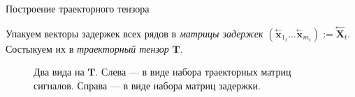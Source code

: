 \documentclass[10pt]{beamer}
\newcommand{\delayV}[1]{\overset{\leftarrow}{\textbf{x}}_{#1}}
\newcommand{\delayM}[1]{\overset{\leftarrow}{\mathbf{X}}_{#1}}
\theoremstyle{definition}
\begin{document}
	\begin{frame}{Построение траекторного тензора}
		
		Упакуем векторы задержек всех рядов в \emph{матрицы задержек} $ ( \delayV{1_t} \ldots \delayV{m_t} ) := \delayM{t} $. Состыкуем их в \emph{траекторный тензор} $ \textbf{T} $.
		
		\begin{figure}[h]
			\centering
			
			\caption{Два вида на $ \textbf{T} $. Слева --- в виде набора траекторных матриц сигналов. Справа --- в виде набора матриц задержки.}\label{pic:traj_tensor}
		\end{figure}
		
	\end{frame}
	
\end{document}
